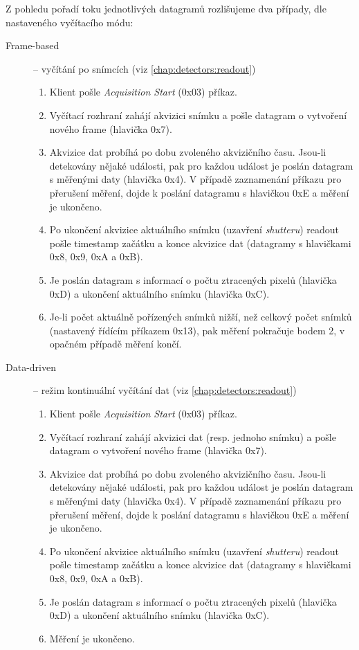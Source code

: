 Z pohledu pořadí toku jednotlivých datagramů rozlišujeme dva případy, dle nastaveného vyčítacího módu:
\begin{description}
   \item[Frame-based] -- vyčítání po snímcích (viz \ref{chap:detectors:readout})
   \begin{enumerate}
       \item Klient pošle \textit{Acquisition Start} (0x03) příkaz.
       \item Vyčítací rozhraní zahájí akvizici snímku a pošle datagram o vytvoření nového frame (hlavička 0x7).
       \item Akvizice dat probíhá po dobu zvoleného akvizičního času. Jsou-li detekovány nějaké události, pak pro každou událost je poslán datagram s měřenými daty (hlavička 0x4). V případě zaznamenání příkazu pro přerušení měření, dojde k poslání datagramu s hlavičkou 0xE a měření je ukončeno.
       \item Po ukončení akvizice aktuálního snímku (uzavření \textit{shutteru}) readout pošle timestamp začátku a konce akvizice dat (datagramy s hlavičkami 0x8, 0x9, 0xA a 0xB).
       \item Je poslán datagram s informací o počtu ztracených pixelů (hlavička 0xD) a ukončení aktuálního snímku (hlavička 0xC).
       \item Je-li počet aktuálně pořízených snímků nižší, než celkový počet snímků (nastavený řídícím příkazem 0x13), pak měření pokračuje bodem 2, v opačném případě měření končí.
   \end{enumerate}
   \item[Data-driven] -- režim kontinuální vyčítání dat (viz \ref{chap:detectors:readout})
   \begin{enumerate}
    \item Klient pošle \textit{Acquisition Start} (0x03) příkaz.
    \item Vyčítací rozhraní zahájí akvizici dat (resp. jednoho snímku) a pošle datagram o vytvoření nového frame (hlavička 0x7).
    \item Akvizice dat probíhá po dobu zvoleného akvizičního času. Jsou-li detekovány nějaké události, pak pro každou událost je poslán datagram s měřenými daty (hlavička 0x4). V případě zaznamenání příkazu pro přerušení měření, dojde k poslání datagramu s hlavičkou 0xE a měření je ukončeno.
    \item Po ukončení akvizice aktuálního snímku (uzavření \textit{shutteru}) readout pošle timestamp začátku a konce akvizice dat (datagramy s hlavičkami 0x8, 0x9, 0xA a 0xB).
    \item Je poslán datagram s informací o počtu ztracených pixelů (hlavička 0xD) a ukončení aktuálního snímku (hlavička 0xC).
    \item Měření je ukončeno.
\end{enumerate}
\end{description}

